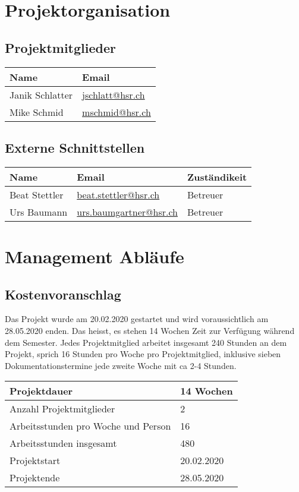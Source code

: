 \documentclass[
	ngerman,
	toc=listof, %
	toc=bibliography, %
	footnotes=multiple, %
	parskip=half, %
	numbers=noendperiod %
]{scrartcl}
\begin{document}
\section{Projektorganisation}

	\subsection{Projektmitglieder}
		\begin{tabularx}{0.9\textwidth}{lX}
			\toprule
			Name & Email \\
			\midrule
			Janik Schlatter & \url{jschlatt@hsr.ch} \\
			Mike Schmid & \url{mschmid@hsr.ch} \\
			\bottomrule
		\end{tabularx}

	\subsection{Externe Schnittstellen}
		\begin{tabularx}{0.9\textwidth}{lXl}
			\toprule
			Name & Email & Zuständikeit \\
			\midrule
			Beat Stettler & \url{beat.stettler@hsr.ch} & Betreuer \\
			Urs Baumann & \url{urs.baumgartner@hsr.ch} & Betreuer \\
			\bottomrule
		\end{tabularx}

\section{Management Abläufe}

	\subsection{Kostenvoranschlag}
		Das Projekt wurde am 20.02.2020 gestartet und wird voraussichtlich am 28.05.2020 enden.
		Das heisst, es stehen 14 Wochen Zeit zur Verfügung während dem Semester. 
		Jedes Projektmitglied arbeitet insgesamt 240 Stunden an dem Projekt, sprich 16 Stunden pro Woche pro Projektmitglied, inklusive sieben Dokumentationstermine jede zweite Woche mit ca 2-4 Stunden.

		\begin{tabularx}{\textwidth}{Xl}
			\midrule
			Projektdauer & 14 Wochen \\
			\midrule
			Anzahl Projektmitglieder & 2 \\
			\midrule
			Arbeitsstunden pro Woche und Person & 16 \\
			\midrule
			Arbeitsstunden insgesamt & 480 \\
			\midrule
			Projektstart & 20.02.2020 \\
			\midrule
			Projektende & 28.05.2020 \\
			\midrule
		\end{tabularx}
\end{document}
